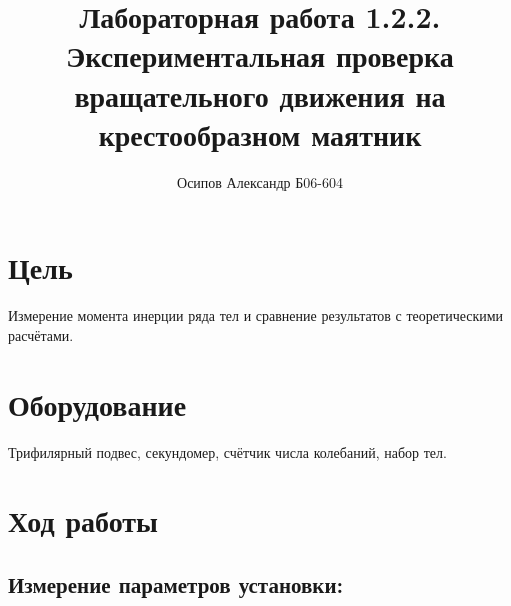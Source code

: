 \documentclass[12pt]{extarticle}
\begin{document}
\author{Осипов Александр Б06-604}
\title{Лабораторная работа 1.2.2. Экспериментальная проверка вращательного движения на 
крестообразном маятник}
\maketitle
\section{Цель}

Измерение момента инерции ряда тел и сравнение результатов с теоретическими расчётами.

\section{Оборудование}

Трифилярный подвес, секундомер, счётчик числа колебаний, набор тел.

\section{Ход работы}
\subsection{Измерение параметров установки:}

\vspace{5mm}
\end{document}
